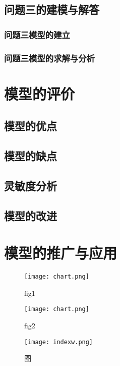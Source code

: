 \documentclass[withoutpreface,bwprint]{cumcmthesis} %
\begin{document}
\subsection{问题三的建模与解答}

\subsubsection{问题三模型的建立}


\subsubsection{问题三模型的求解与分析}


\section{模型的评价}
\subsection{模型的优点}
\subsection{模型的缺点}
\subsection{灵敏度分析}
\subsection{模型的改进}
\section{模型的推广与应用}

\begin{figure}
\begin{minipage}[t]{0.5\linewidth}
\centering
\texttt{[image: chart.png]}
\caption{fig1}
\label{fig:side:a}
\end{minipage}%
\begin{minipage}[t]{0.5\linewidth}
\centering
\texttt{[image: chart.png]}
\caption{fig2}
\label{fig:side:b}
\end{minipage}
\end{figure}

\begin{figure}[htbp]
\centering
\texttt{[image: indexw.png]}
\caption{图}
\end{figure}
\end{document}
